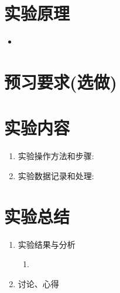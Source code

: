 \documentclass[UTF8,AutoFakeBold]{article}%
\begin{document}
\section{实验原理}
\begin{itemize}
    \item 
\end{itemize}
\section{预习要求(选做)}
    

\section{实验内容}
\begin{enumerate}
    \item 实验操作方法和步骤: 
    \item 实验数据记录和处理:

\end{enumerate}



\section{实验总结}
\begin{enumerate}
    \item {实验结果与分析}\begin{enumerate}
        \item 
    \end{enumerate}
    \item $\textbf{讨论、心得}$
    \begin{flushleft}

    \end{flushleft}   
\end{enumerate}
\end{document}
